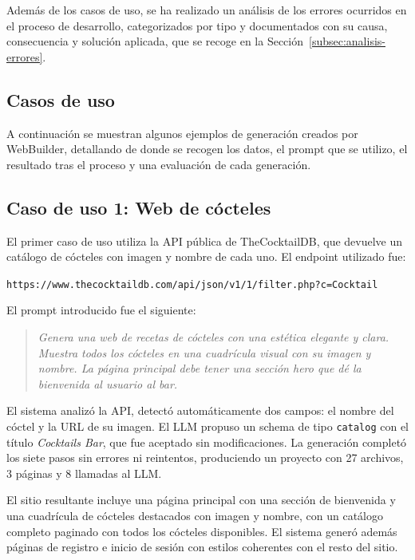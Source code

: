 Además de los casos de uso, se ha realizado un análisis de los errores ocurridos en el proceso de desarrollo, categorizados por tipo y documentados con su causa, consecuencia y solución aplicada, que se recoge en la Sección~\ref{subsec:analisis-errores}.



\subsection{Casos de uso}
\label{subsec:casos-uso}

A continuación se muestran algunos ejemplos de generación creados por WebBuilder, detallando de donde se recogen los datos,
el prompt que se utilizo, el resultado tras el proceso y una evaluación de cada generación.


\subsection{Caso de uso 1: Web de cócteles}
\label{subsec:caso-cocktails}

El primer caso de uso utiliza la API pública de TheCocktailDB, que devuelve un catálogo de cócteles con imagen 
y nombre de cada uno. El endpoint utilizado fue:

\begin{center}
\texttt{https://www.thecocktaildb.com/api/json/v1/1/filter.php?c=Cocktail}
\end{center}

El prompt introducido fue el siguiente:

\begin{quote}
	\textit{Genera una web de recetas de cócteles con una estética elegante y clara. Muestra todos los cócteles 
	en una cuadrícula visual con su imagen y nombre. La página principal debe tener una sección hero que dé la bienvenida al usuario al bar.}
\end{quote}

El sistema analizó la API, detectó automáticamente dos campos: el nombre del cóctel y la URL de su imagen. 
El LLM propuso un schema de tipo \texttt{catalog} con el título \textit{Cocktails Bar}, que fue aceptado sin modificaciones. La generación completó los siete pasos sin errores ni reintentos, produciendo un proyecto con 27 archivos, 3 páginas y 8 llamadas al LLM.

El sitio resultante incluye una página principal con una sección de bienvenida y una cuadrícula de cócteles 
destacados con imagen y nombre, con un catálogo completo paginado con todos los cócteles disponibles. El sistema generó además páginas de registro e inicio de sesión con estilos coherentes con el resto del sitio.

